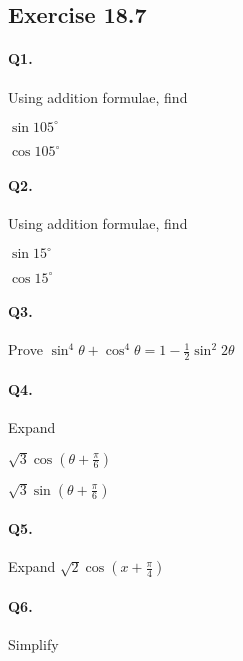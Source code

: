 \documentclass{article}
\begin{document}
\subsection {Exercise 18.7}
\paragraph{Q1.}
Using addition formulae, find

\begin{enumerate*}[label=\roman*)]
  \item $\sin 105^{\circ}$
  \item $\cos 105^{\circ}$
\end{enumerate*}

\paragraph{Q2.}
Using addition formulae, find

\begin{enumerate*}[label=\roman*)]
  \item $\sin 15^{\circ}$
  \item $\cos 15^{\circ}$
\end{enumerate*}

\paragraph{Q3.}
Prove $\sin^{4}\theta + \cos^{4}\theta = 1 - \frac{1}{2}\sin^{2}2\theta$

\paragraph{Q4.}
Expand

\begin{enumerate*}[label=\alph*)]
  \item $\sqrt{3} \cos \left( \theta + \frac{\pi}{6} \right)$
  \item $\sqrt{3} \sin \left( \theta + \frac{\pi}{6} \right)$
\end{enumerate*}

\paragraph{Q5.}
Expand $\sqrt{2} \cos \left( x + \frac{\pi}{4} \right)$

\paragraph{Q6.}
Simplify 
\end{document}

